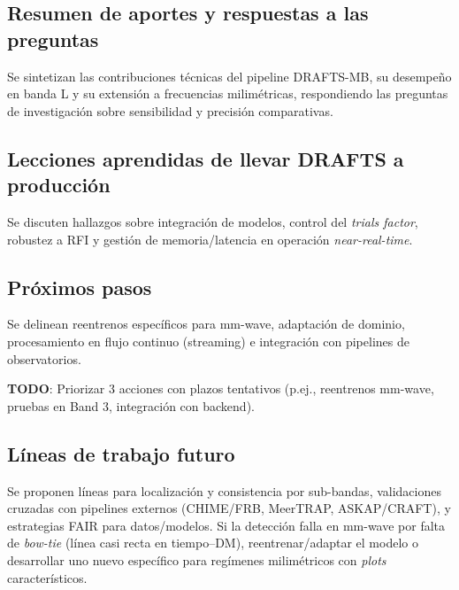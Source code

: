 
\subsection{Resumen de aportes y respuestas a las preguntas}
Se sintetizan las contribuciones técnicas del pipeline DRAFTS-MB, su desempeño en banda L y su extensión a frecuencias milimétricas, respondiendo las preguntas de investigación sobre sensibilidad y precisión comparativas.

\subsection{Lecciones aprendidas de llevar DRAFTS a producción}
Se discuten hallazgos sobre integración de modelos, control del \textit{trials factor}, robustez a RFI y gestión de memoria/latencia en operación \textit{near-real-time}.

\subsection{Próximos pasos}
Se delinean reentrenos específicos para mm-wave, adaptación de dominio, procesamiento en flujo continuo (streaming) e integración con pipelines de observatorios.

\textbf{TODO}: Priorizar 3 acciones con plazos tentativos (p.ej., reentrenos mm-wave, pruebas en Band 3, integración con backend).

\subsection{Líneas de trabajo futuro}
Se proponen líneas para localización y consistencia por sub-bandas, validaciones cruzadas con pipelines externos (CHIME/FRB, MeerTRAP, ASKAP/CRAFT), y estrategias FAIR para datos/modelos. Si la detección falla en mm-wave por falta de \textit{bow-tie} (línea casi recta en tiempo--DM), reentrenar/adaptar el modelo o desarrollar uno nuevo específico para regímenes milimétricos con \textit{plots} característicos.
